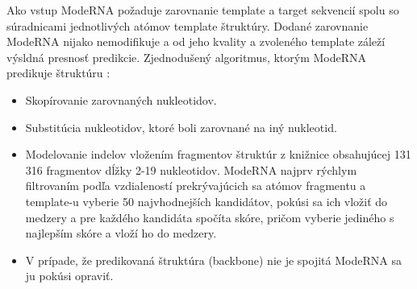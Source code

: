 \indent Ako vstup ModeRNA požaduje zarovnanie  template a target sekvencií spolu so súradnicami jednotlivých atómov template štruktúry. Dodané zarovnanie ModeRNA nijako nemodifikuje a od jeho kvality a zvoleného template záleží výsldná presnosť predikcie. 
Zjednodušený algoritmus, ktorým ModeRNA predikuje štruktúru \cite{Rother11}: 

\begin{itemize}
\item Skopírovanie zarovnaných nukleotidov.
\item Substitúcia nukleotidov, ktoré boli zarovnané na iný nukleotid.
\item Modelovanie indelov vložením fragmentov štruktúr z knižnice obsahujúcej 131 316 fragmentov dĺžky 2-19 nukleotidov. ModeRNA najprv rýchlym filtrovaním podľa vzdialeností  prekrývajúcich sa atómov fragmentu a template-u vyberie 50 najvhodnejších kandidátov, pokúsi sa ich vložiť do medzery a pre každého kandidáta spočíta skóre, pričom vyberie jediného s najlepším skóre a  vloží ho do medzery.
\item V prípade, že predikovaná štruktúra (backbone) nie je spojitá ModeRNA sa ju pokúsi opraviť.
\end{itemize}